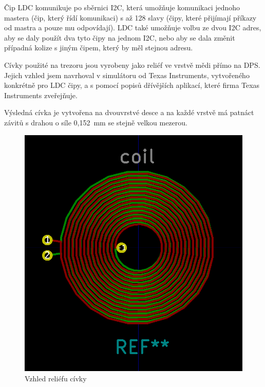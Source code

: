 Čip LDC komunikuje po sběrnici I2C, která umožňuje komunikaci jednoho mastera (čip, který řídí komunikaci) s až 128 slavy (čipy, které přijímají příkazy
od mastra a pouze mu odpovídají). LDC také umožňuje volbu ze dvou I2C adres, aby se daly použít dva tyto čipy na jednom I2C, nebo aby se dala změnit 
případná kolize s jiným čipem, který by měl stejnou adresu.

\newpage

Cívky použité na trezoru jsou vyrobeny jako reliéf ve vrstvě mědi přímo na DPS. Jejich vzhled jsem navrhoval v simulátoru od Texas Instruments, 
vytvořeného konkrétně pro LDC čipy, a s pomocí popisů dřívějších aplikací, které firma Texas Instruments zveřejňuje.


Výsledná cívka je vytvořena na dvouvrstvé desce a na každé vrstvě má patnáct závitů s drahou o síle 0,152~mm se stejně velkou mezerou.

\begin{figure}[htbp]
    \centering
    \includegraphics[width=\textwidth]{kapitoly/obrazky/E4/elektronika_tlakove_desky/civka.png}
    \caption{Vzhled reliéfu cívky}
    \label{fig:E4-relief_civka}
\end{figure}

